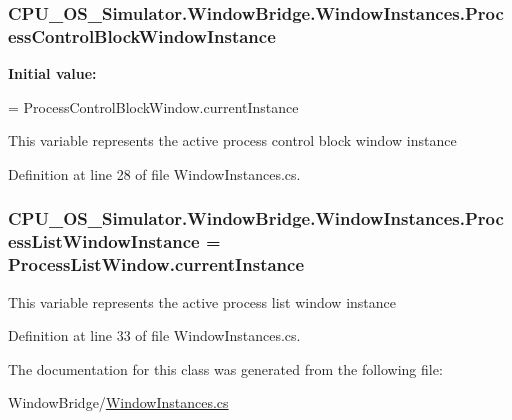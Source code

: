 \subsubsection[{Process\+Control\+Block\+Window\+Instance}]{ C\+P\+U\+\_\+\+O\+S\+\_\+\+Simulator.\+Window\+Bridge.\+Window\+Instances.\+Process\+Control\+Block\+Window\+Instance\hspace{0.3cm}{\ttfamily [static]}}\label{class_c_p_u___o_s___simulator_1_1_window_bridge_1_1_window_instances_a7c6ba1b614cf567f4a34d455cd98b8e0}
{\bfseries Initial value\+:}
\begin{DoxyCode}
= 
            ProcessControlBlockWindow.currentInstance
\end{DoxyCode}


This variable represents the active process control block window instance 



Definition at line 28 of file Window\+Instances.\+cs.

\hypertarget{class_c_p_u___o_s___simulator_1_1_window_bridge_1_1_window_instances_a1e4da15e51ef4f7cd4f4862e411630e9}{}
\subsubsection[{Process\+List\+Window\+Instance}]{ C\+P\+U\+\_\+\+O\+S\+\_\+\+Simulator.\+Window\+Bridge.\+Window\+Instances.\+Process\+List\+Window\+Instance = {\bf Process\+List\+Window.\+current\+Instance}\hspace{0.3cm}{\ttfamily [static]}}\label{class_c_p_u___o_s___simulator_1_1_window_bridge_1_1_window_instances_a1e4da15e51ef4f7cd4f4862e411630e9}


This variable represents the active process list window instance 



Definition at line 33 of file Window\+Instances.\+cs.



The documentation for this class was generated from the following file\+:\begin{DoxyCompactItemize}
\item 
Window\+Bridge/\hyperlink{_window_instances_8cs}{Window\+Instances.\+cs}\end{DoxyCompactItemize}
